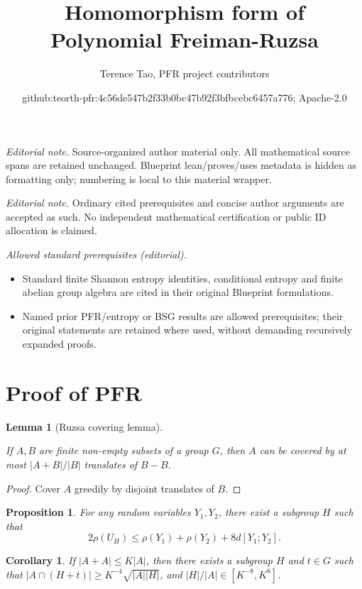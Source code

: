 \documentclass[10pt,a4paper]{article}
\title{Homomorphism form of Polynomial Freiman-Ruzsa}
\author{Terence Tao, PFR project contributors}
\date{github:teorth-pfr:4c56de547b2f33b0bc47b92f3bfbcebc6457a776; Apache-2.0}
\newtheorem{lemma}[theorem]{Lemma}
\newtheorem{proposition}[theorem]{Proposition}
\newtheorem{corollary}[theorem]{Corollary}
\newcommand{\lean}[1]{}
\newcommand{\leanok}{}
\newcommand{\chapter}[1]{\section{#1}}
\begin{document}
\maketitle
\noindent\textit{Editorial note.} Source-organized author material only. All mathematical source spans are retained unchanged. Blueprint lean/proves/uses metadata is hidden as formatting only; numbering is local to this material wrapper.\par\medskip
\noindent\textit{Editorial note.} Ordinary cited prerequisites and concise author arguments are accepted as such. No independent mathematical certification or public ID allocation is claimed.\par\medskip
\noindent\textit{Allowed standard prerequisites (editorial).}\begin{itemize}
\item Standard finite Shannon entropy identities, conditional entropy and finite abelian group algebra are cited in their original Blueprint formulations.
\item Named prior PFR/entropy or BSG results are allowed prerequisites; their original statements are retained where used, without demanding recursively expanded proofs.
\end{itemize}\medskip
\chapter{Proof of PFR}

\begin{lemma}[Ruzsa covering lemma]
\label{ruz-cov}
\lean{Finset.ruzsa_covering_add}
\leanok
If $A,B$ are finite non-empty subsets of a group $G$, then $A$ can be covered by at most $|A+B|/|B|$ translates of $B-B$.
\end{lemma}
\begin{proof}
\leanok
Cover $A$ greedily by disjoint translates of $B$.
\end{proof}



\begin{proposition} \label{pfr-rho}\lean{rho_PFR_conjecture}\leanok For any random variables $Y_1,Y_2$, there exist a subgroup $H$ such that
  $$ 2\rho(U_H) \leq \rho(Y_1) + \rho(Y_2) + 8 d[Y_1;Y_2].$$
\end{proposition}


\begin{corollary}\label{pfr-9-aux}\lean{better_PFR_conjecture_aux0}\leanok
If $|A+A| \leq K|A|$, then there exists a subgroup $H$ and $t\in G$ such that
$|A \cap (H+t)| \geq K^{-4} \sqrt{|A||H|}$, and $|H|/|A|\in[K^{-8},K^8]$.
\end{corollary}
\end{document}
